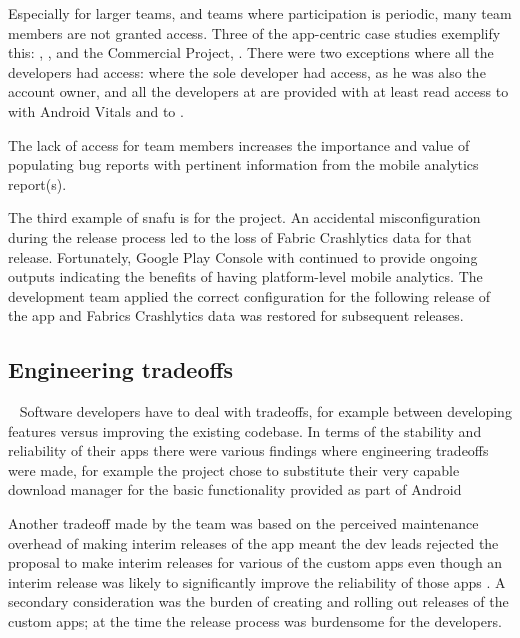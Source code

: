 Especially for larger teams, and teams where participation is periodic, many team members are not granted access. Three of the app-centric case studies exemplify this: , , and the Commercial Project, . There were two exceptions where all the developers had access:  where the sole developer had access, as he was also the account owner, and all the developers at  are provided with at least read access to  with Android Vitals and to .

The lack of access for team members increases the importance and value of populating bug reports with pertinent information from the mobile analytics report(s).

The third example of \Gls{snafu} is for the  project. An accidental misconfiguration during the release process led to the loss of Fabric Crashlytics data for that release. Fortunately, Google Play Console with  continued to provide ongoing outputs indicating the benefits of having platform-level mobile analytics. The development team applied the correct configuration for the following release of the app and Fabrics Crashlytics data was restored for subsequent releases.

\subsection{Engineering tradeoffs}~\label{aiu-engineering-tradeoffs-topic}
Software developers have to deal with tradeoffs, for example between developing features versus improving the existing codebase. In terms of the stability and reliability of their apps there were various findings where engineering tradeoffs were made, for example the  project chose to substitute their very capable download manager for the basic functionality provided as part of Android~

Another tradeoff made by the   team was based on the perceived maintenance overhead of making interim releases of the app meant the dev leads rejected the proposal to make interim releases for various of the custom apps even though an interim release was likely to significantly improve the reliability of those apps . A secondary consideration was the burden of creating and rolling out releases of the custom apps; at the time the release process was burdensome for the developers. 

